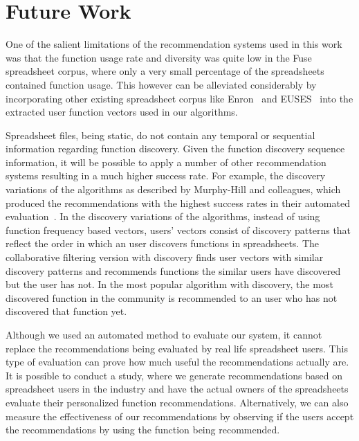 \documentclass{article} %
\begin{document}
\section{Future Work}
One of the salient limitations of the recommendation systems used in this work was that the function usage rate and diversity was quite low in the Fuse spreadsheet corpus, where only a very small percentage of the spreadsheets contained function usage. This however can be alleviated considerably by incorporating other existing spreadsheet corpus like Enron~\cite{hermans2014enron} and EUSES~\cite{fisher2005euses} into the extracted user function vectors used in our algorithms.

Spreadsheet files, being static, do not contain any temporal or sequential information regarding function discovery. Given the function discovery sequence information, it will be possible to apply a number of other recommendation systems resulting in a much higher success rate. For example, the discovery variations of the algorithms as described by Murphy-Hill and colleagues, which produced the recommendations with the highest success rates in their automated evaluation~\cite{murphy2012improving}. In the discovery variations of the algorithms, instead of using function frequency based vectors, users' vectors consist of discovery patterns that reflect the order in which an user discovers functions in spreadsheets. The collaborative filtering version with discovery finds user vectors with similar discovery patterns and recommends functions the similar users have discovered but the user has not. In the most popular algorithm with discovery, the most discovered function in the community is recommended to an user who has not discovered that function yet.

Although we used an automated method to evaluate our system, it cannot replace the recommendations being evaluated by real life spreadsheet users. This type of evaluation can prove how much useful the recommendations actually are. It is possible to conduct a study, where we generate recommendations based on spreadsheet users in the industry and have the actual owners of the spreadsheets evaluate their personalized function recommendations. Alternatively, we can also measure the effectiveness of our recommendations by observing if the users accept the recommendations by using the function being recommended.



\end{document}
